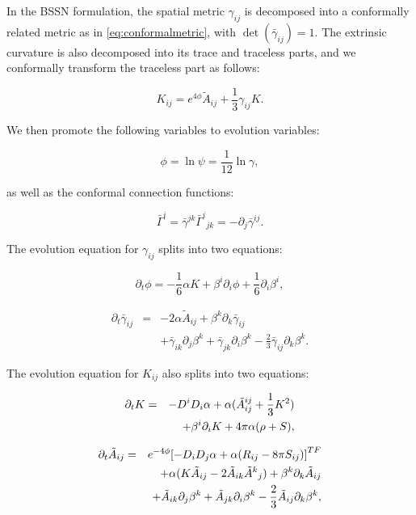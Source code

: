 \documentclass[%
 reprint,
 amsmath,amssymb,
 aps,
 prd,
]{revtex4-2}
\begin{document}
In the BSSN formulation, the spatial metric $\gamma_{ij}$ is decomposed into a conformally related metric as in \eqref{eq:conformalmetric}, with $\det (\bar{\gamma}_{ij}) = 1$. The extrinsic curvature is also decomposed into its trace and traceless parts, and we conformally transform the traceless part as follows:

\begin{equation}
	K_{ij} = e^{4\phi}\tilde{A}_{ij} + \frac{1}{3}\gamma_{ij}K.
\end{equation}

We then promote the following variables to evolution variables:

\begin{equation}
	\phi = \ln \psi = \frac{1}{12}\ln \gamma,
\end{equation}

as well as the conformal connection functions:

\begin{equation}
	\bar{\Gamma}^i = \bar{\gamma}^{jk}\bar{\Gamma}^i{}_{jk} = -\partial_j \bar{\gamma}^{ij}.
\end{equation}

The evolution equation for $\gamma_{ij}$ splits into two equations:

\begin{equation}
	\partial_t \phi = - \frac{1}{6}\alpha K + \beta^i \partial_i \phi + \frac{1}{6}\partial_i \beta^i,
\end{equation}

\begin{eqnarray}
	\label{eq:bssn_gamma}
	\partial_t \bar{\gamma}_{ij} &=& -2\alpha \tilde{A}_{ij} + \beta^k \partial_k \bar{\gamma}_{ij}  \nonumber\\&&+\bar{\gamma}_{ik}\partial_j \beta^k + \bar{\gamma}_{jk}\partial_i \beta^k - \frac{2}{3}\bar{\gamma}_{ij}\partial_k\beta^k.
\end{eqnarray}

The evolution equation for $K_{ij}$ also splits into two equations:

\begin{eqnarray}
	\label{eq:bssn_K}
	\partial_t K &=& -D^iD_i \alpha + \alpha (\tilde{A}_{ij}\title{A}^{ij} + \frac{1}{3}K^2)\nonumber\\&&+\beta^i\partial_i K + 4\pi \alpha (\rho + S),
\end{eqnarray}

\begin{eqnarray}
	\label{eq:bssn_A}
	\partial_t \tilde{A}_{ij} &=& e^{-4\phi}\qty[-D_iD_j\alpha + \alpha(R_{ij} - 8\pi S_{ij})]^{TF}\nonumber\\&& + \alpha(K\tilde{A}_{ij} - 2\tilde{A}_{ik}\tilde{A}^k{}_{j}) + \beta^k\partial_k \tilde{A}_{ij} \nonumber\\&&+ \tilde{A}_{ik}\partial_j\beta^k + \tilde{A}_{jk}\partial_i\beta^k - \frac{2}{3}\tilde{A}_{ij}\partial_k\beta^k,
\end{eqnarray}
\end{document}
